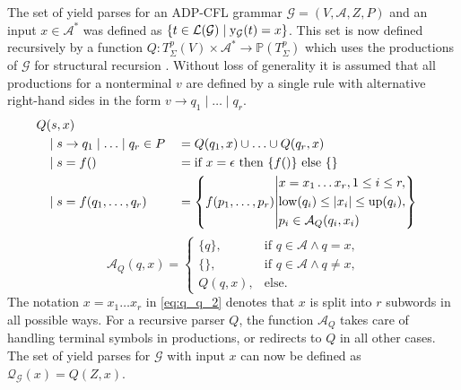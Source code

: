 \documentclass[
    a4paper,
    12pt,
    twoside,
    BCOR=12mm,
    parskip=half,
    chapterprefix,
    numbers=noenddot,
    bibliography=totoc
]{scrbook}
\begin{document}
The set of yield parses for an ADP-CFL grammar $\mathcal{G}=(V,\mathcal{A},Z,P)$ and an input $x \in \mathcal{A}^*$ was defined as $\{ t \in \mathcal{L}(\mathcal{G}) \mid \mathrm{y}_\mathcal{G}(t) = x \}$. This set is now defined recursively by a function $Q: T^p_\Sigma(V) \times \mathcal{A}^* \to \mathbb{P}(T^p_\Sigma)$ which uses the productions of $\mathcal{G}$ for structural recursion \citep[sect. 3.3]{giegerich_implementing_2002}. Without loss of generality it is assumed that all productions for a nonterminal $v$ are defined by a single rule with alternative right-hand sides in the form $v \to q_1 \mid \ldots \mid q_r$.
\begin{align}
	Q&(s,x) \nonumber\\
	&\mid s \to q_1 \mid \ldots \mid q_r \in P &&= Q(q_1,x) \cup \ldots \cup Q(q_r,x) \label{eq:q_q_0}\\
	&\mid s=f() &&= \text{if $x=\epsilon$ then $\{f()\}$ else $\{\}$} \label{eq:q_q_1}\\
	&\mid s=f(q_1,\ldots,q_r) &&= \left\{f(p_1,\ldots,p_r) \middle\vert
			\begin{aligned}
				&x=x_1 \ldots x_r, 1 \leq i \leq r,\\
				&\op{low}(q_i) \leq |x_i| \leq \op{up}(q_i),\\
				&p_i \in \mathcal{A}_Q(q_i,x_i)
			\end{aligned}
			\right\} \label{eq:q_q_2}
\end{align}
\begin{equation}
	\mathcal{A}_Q(q,x)= \begin{cases}
		\{q\}, & \text{if $q \in \mathcal{A} \wedge q=x$,}\\
		\{\},  & \text{if $q \in \mathcal{A} \wedge q \neq x$,}\\
		Q(q,x),&\text{else.}
	\end{cases}
\end{equation}
The notation $x=x_1 \ldots x_r$ in \cref{eq:q_q_2} denotes that $x$ is split into $r$ subwords in all possible ways. For a recursive parser $Q$, the function $\mathcal{A}_Q$ takes care of handling terminal symbols in productions, or redirects to $Q$ in all other cases. The set of yield parses for $\mathcal{G}$ with input $x$ can now be defined as $\mathcal{Q}_\mathcal{G}(x) = Q(Z,x)$.
\end{document}
